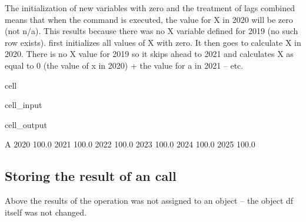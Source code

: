 \documentclass[letterpaper,10pt,english]{jupyterBook}
\begin{document}
\sphinxAtStartPar
The initialization of new variables with zero and the treatment of lags combined means that when the command  is executed, the value for X in 2020 will be zero (not n/a). This results because there was no X variable defined for 2019 (no such row exists).  first initializes all values of X with zero.  It then goes to calculate X in 2020.  There is no X value for 2019 so it skips ahead to 2021 and calculates X as equal to 0 (the value of x in 2020) + the value for a in 2021 – etc.

\begin{sphinxuseclass}{cell}\begin{sphinxVerbatimInput}

\begin{sphinxuseclass}{cell_input}
\begin{sphinxVerbatim}[commandchars=\\\{\}]
\end{sphinxVerbatim}

\end{sphinxuseclass}\end{sphinxVerbatimInput}
\begin{sphinxVerbatimOutput}

\begin{sphinxuseclass}{cell_output}
\begin{sphinxVerbatim}[commandchars=\\\{\}]
          A
2020  100.0
2021  100.0
2022  100.0
2023  100.0
2024  100.0
2025  100.0
\end{sphinxVerbatim}

\end{sphinxuseclass}\end{sphinxVerbatimOutput}

\end{sphinxuseclass}

\subsection{Storing the result of an  call}
\label{\detokenize{content/04_PythonEssentials/mfcalc:storing-the-result-of-an-mfcalc-call}}
\sphinxAtStartPar
Above the results of the  operation was not assigned to an object – the  object df itself was not changed.
\end{document}
